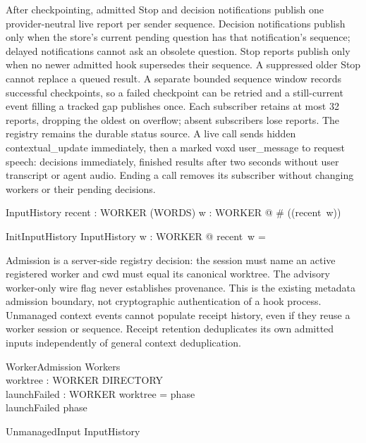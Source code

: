 \documentclass[a4paper,10pt,fleqn]{article}
\begin{document}
After checkpointing, admitted Stop and decision notifications publish one
provider-neutral live report per sender sequence. Decision notifications publish
only when the store's current pending question has that notification's sequence;
delayed notifications cannot ask an obsolete question. Stop reports publish only
when no newer admitted hook supersedes their sequence. A suppressed older Stop
cannot replace a queued result. A separate bounded sequence
window records successful checkpoints, so a failed checkpoint can be retried
and a still-current event filling a tracked gap publishes once. Each subscriber retains at
most 32 reports, dropping the oldest on overflow; absent subscribers lose
reports. The registry remains the durable status source. A live call sends
hidden contextual\_update immediately, then a marked voxd user\_message to
request speech: decisions immediately, finished results after two seconds
without user transcript or agent audio. Ending a call removes its subscriber
without changing workers or their pending decisions.

\begin{schema}{InputHistory}
  recent : WORKER \fun (\nat \pfun WORDS)
\where
  \forall w : WORKER @ \# (\dom (recent~w)) 
\end{schema}

\begin{schema}{InitInputHistory}
  InputHistory
\where
  \forall w : WORKER @ recent~w = \emptyset
\end{schema}

Admission is a server-side registry decision: the session must name an active
registered worker and cwd must equal its canonical worktree. The advisory
worker-only wire flag never establishes provenance. This is the existing
metadata admission boundary, not cryptographic authentication of a hook
process. Unmanaged context events cannot populate receipt history, even if
they reuse a worker session or sequence. Receipt retention deduplicates its
own admitted inputs independently of general context deduplication.

\begin{schema}{WorkerAdmission}
  Workers \\
  worktree : WORKER \pfun DIRECTORY \\
  launchFailed : \power WORKER
\where
  \dom worktree = \dom phase \\
  launchFailed \subseteq \dom phase
\end{schema}

\begin{schema}{UnmanagedInput}
  \Xi InputHistory
\end{schema}
\end{document}
